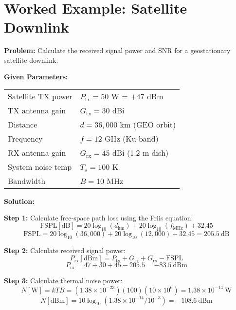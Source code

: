 \section{Worked Example: Satellite Downlink}

\textbf{Problem:} Calculate the received signal power and SNR for a geostationary satellite downlink.

\textbf{Given Parameters:}

\begin{tabular}{@{}ll@{}}
Satellite TX power & $P_{\text{tx}} = 50$ W = $+47$ dBm \\
TX antenna gain & $G_{\text{tx}} = 30$ dBi \\
Distance & $d = 36{,}000$ km (GEO orbit) \\
Frequency & $f = 12$ GHz (Ku-band) \\
RX antenna gain & $G_{\text{rx}} = 45$ dBi (1.2 m dish) \\
System noise temp & $T_s = 100$ K \\
Bandwidth & $B = 10$ MHz \\
\end{tabular}

\textbf{Solution:}

\textbf{Step 1:} Calculate free-space path loss using the Friis equation:
\begin{equation}
\text{FSPL} [\text{dB}] = 20\log_{10}(d_{\text{km}}) + 20\log_{10}(f_{\text{MHz}}) + 32.45
\end{equation}
\begin{equation}
\text{FSPL} = 20\log_{10}(36{,}000) + 20\log_{10}(12{,}000) + 32.45 = 205.5\ \text{dB}
\end{equation}

\textbf{Step 2:} Calculate received signal power:
\begin{equation}
P_{\text{rx}} [\text{dBm}] = P_{\text{tx}} + G_{\text{tx}} + G_{\text{rx}} - \text{FSPL}
\end{equation}
\begin{equation}
P_{\text{rx}} = 47 + 30 + 45 - 205.5 = -83.5\ \text{dBm}
\end{equation}

\textbf{Step 3:} Calculate thermal noise power:
\begin{equation}
N [\text{W}] = kTB = (1.38 \times 10^{-23})(100)(10 \times 10^6) = 1.38 \times 10^{-14}\ \text{W}
\end{equation}
\begin{equation}
N [\text{dBm}] = 10\log_{10}(1.38 \times 10^{-14} / 10^{-3}) = -108.6\ \text{dBm}
\end{equation}

